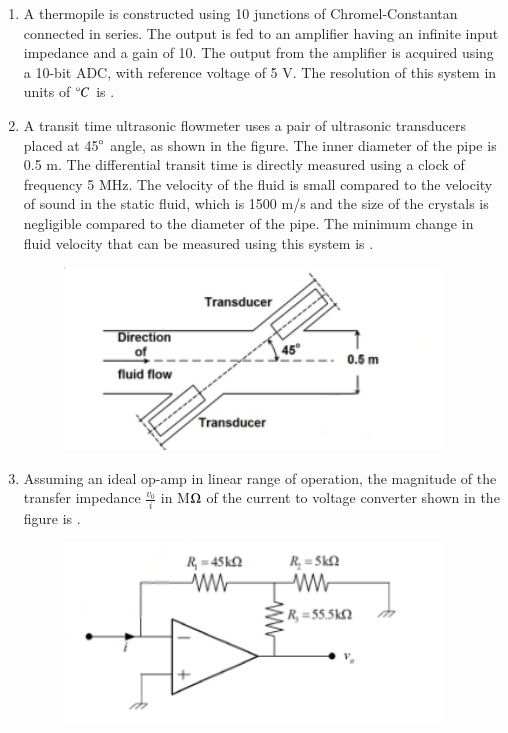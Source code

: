\documentclass[journal,12pt,onecolumn]{IEEEtran}
\theoremstyle{remark}
\begin{document}
\begin{enumerate}
    \hfill{}

    
    
    \item A thermopile is constructed using 10 junctions of Chromel-Constantan \\  connected in series. The output is fed to an amplifier having an infinite input impedance and a gain of 10. The output from the amplifier is acquired using a 10-bit ADC, with reference voltage of 5 V. The resolution of this system in units of $\degree C$ is \underline{\hspace{2cm}}.

    \hfill{}

    

    \item A transit time ultrasonic flowmeter uses a pair of ultrasonic transducers placed at 45$\degree$ angle, as shown in the figure. The inner diameter of the pipe is 0.5 m. The differential transit time is directly measured using a clock of frequency 5 MHz. The velocity of the fluid is small compared to the velocity of sound in the static fluid, which is 1500 m/s and the size of the crystals is negligible compared to the diameter of the pipe. The minimum change in fluid velocity  that can be measured using this system is \underline{\hspace{2cm}}.
    \begin{figure}[H]
        \centering
        \includegraphics[width=0.6\columnwidth]{q36}
        \caption*{}
        \label{fig:q36}
    \end{figure}

    \hfill{}
    
    \item Assuming an ideal op-amp in linear range of operation, the magnitude of the transfer impedance $\frac{v_0}{i}$ in M$\ohm$ of the current to voltage converter shown in the figure is \underline{\hspace{2cm}}.
    \begin{figure}[H]
        \centering
        \includegraphics[width=0.6\columnwidth]{q37}
        \caption*{}
        \label{fig:q37}
    \end{figure}


\end{enumerate}
\end{document}
